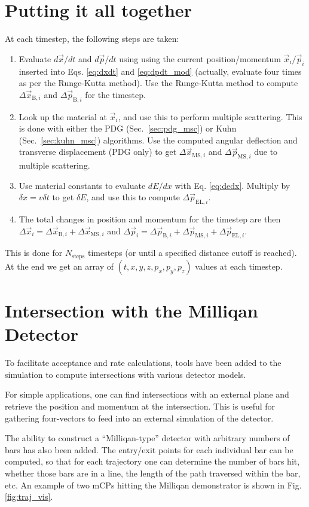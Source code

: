 \documentclass[11pt]{article}
\begin{document}
\section{Putting it all together}
At each timestep, the following steps are taken:
\begin{enumerate}
\item Evaluate $d\vec{x}/dt$ and $d\vec{p}/dt$ using using the current position/momentum $\vec{x}_i/\vec{p}_i$ inserted into Eqs. \ref{eq:dxdt} and \ref{eq:dpdt_mod} (actually,
evaluate four times as per the Runge-Kutta method). Use the Runge-Kutta method to compute $\Delta\vec{x}_{\text{B},i}$ and $\Delta\vec{p}_{\text{B},i}$ for the timestep.
\item Look up the material at $\vec{x}_i$, and use this to perform multiple scattering. 
This is done with either the PDG (Sec.~\ref{sec:pdg_msc}) or Kuhn (Sec.~\ref{sec:kuhn_msc}) algorithms.
Use the computed angular deflection and transverse displacement (PDG only) to get $\Delta\vec{x}_{\text{MS},i}$ and $\Delta\vec{p}_{\text{MS},i}$ due to multiple scattering.
\item Use material constants to evaluate $dE/dx$ with Eq. \ref{eq:dedx}. Multiply by $\delta x=v\delta t$ to get $\delta E$, and use this to compute $\Delta\vec{p}_{\text{EL},i}$.
\item The total changes in position and momentum for the timestep are then $\Delta\vec{x}_i = \Delta\vec{x}_{\text{B},i}+\Delta\vec{x}_{\text{MS},i}$ and
$\Delta\vec{p}_i = \Delta\vec{p}_{\text{B},i}+\Delta\vec{p}_{\text{MS},i}+\Delta\vec{p}_{\text{EL},i}$.
\end{enumerate}

This is done for $N_\text{steps}$ timesteps (or until a specified distance cutoff is reached). At the end we get an array of $(t,x,y,z,p_x,p_y,p_z)$ values at each timestep.

\section{Intersection with the Milliqan Detector}
To facilitate acceptance and rate calculations, tools have been added to the simulation to compute intersections with
various detector models.

For simple applications, one can find intersections with an external plane and retrieve the position and momentum
at the intersection. This is useful for gathering four-vectors to feed into an external simulation of the detector.

The ability to construct a ``Milliqan-type'' detector with arbitrary numbers of bars has also been added.
The entry/exit points for each individual bar can be computed, so that for each trajectory one can determine
the number of bars hit, whether those bars are in a line, the length of the path traversed within the bar, etc.
An example of two mCPs hitting the Milliqan demonstrator is shown in Fig. \ref{fig:traj_vis}.
\end{document}
